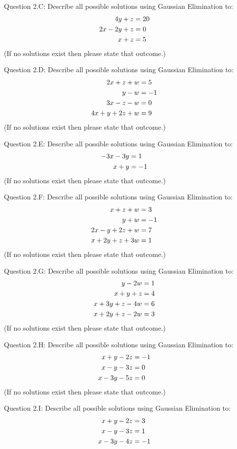 \documentclass{article}
\begin{document}
\par \medskip \noindent 
%
Question 2.C: Describe all possible solutions using Gaussian Elimination to:
\begin{align*}
    4y + z &= 20 \cr 
    2x - 2y + z &= 0 \cr
    x + z &= 5
\end{align*}
(If no solutions exist then please state that outcome.)
\par \medskip \noindent 
%
Question 2.D:  Describe all possible solutions using Gaussian Elimination to:
\begin{align*}
    2x + z + w &= 5 \cr 
    y - w&= -1 \cr
    3x - z - w &= 0\cr
    4x + y + 2z + w &=9
\end{align*}
(If no solutions exist then please state that outcome.)
\par \medskip \noindent 
%
Question 2.E:  Describe all possible solutions using Gaussian Elimination to:
\begin{align*}
    -3x - 3y &= 1 \cr 
      x + y &= -1
\end{align*}
(If no solutions exist then please state that outcome.)
\par \medskip \noindent 
%
Question 2.F:  Describe all possible solutions using Gaussian Elimination to:
\begin{align*}
    x + z + w &= 3 \cr 
    y + w&= -1 \cr
    2x - y +2z + w &= 7\cr
    x + 2y + z + 3w &=1
\end{align*}
(If no solutions exist then please state that outcome.)
\par \medskip \noindent 
%
Question 2.G: Describe all possible solutions using Gaussian Elimination to:
\begin{align*}
     y - 2w &= 1 \cr 
    x + y + z  &= 4 \cr
    x + 3y + z  -4w &= 6\cr
    x + 2y + z - 2w &= 3
\end{align*}
(If no solutions exist then please state that outcome.) 
\par \medskip \noindent 
%
Question 2.H: Describe all possible solutions using Gaussian Elimination to:
\begin{align*}
     x + y - 2z &= -1 \cr 
    x - y -3z  &= 0 \cr
    x - 3y -5 z  &= 0 
\end{align*}
(If no solutions exist then please state that outcome.) 
\par \medskip \noindent 
%
Question 2.I: Describe all possible solutions using Gaussian Elimination to:
\begin{align*}
     x + y - 2z &= 3 \cr 
    x - y -3z  &= 1 \cr
    x - 3y -4 z  &= -1 
\end{align*}
\end{document}
